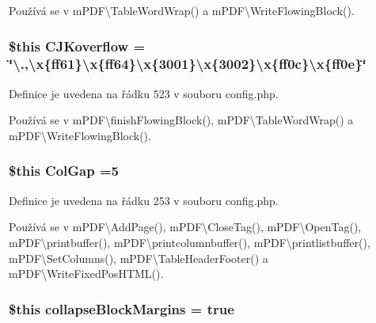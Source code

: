 Používá se v m\-P\-D\-F\textbackslash{}\-Table\-Word\-Wrap() a m\-P\-D\-F\textbackslash{}\-Write\-Flowing\-Block().

\hypertarget{config_8php_af2812cfa35e655533418dd64883a9746}{
\subsubsection[{C\-J\-Koverflow}]{\setlength{\rightskip}{0pt plus 5cm}\$this C\-J\-Koverflow = \char`\"{}\textbackslash{}.,\textbackslash{}x\{ff61\}\textbackslash{}x\{ff64\}\textbackslash{}x\{3001\}\textbackslash{}x\{3002\}\textbackslash{}x\{ff0c\}\textbackslash{}x\{ff0e\}\char`\"{}}}\label{config_8php_af2812cfa35e655533418dd64883a9746}


Definice je uvedena na řádku 523 v souboru config.\-php.



Používá se v m\-P\-D\-F\textbackslash{}finish\-Flowing\-Block(), m\-P\-D\-F\textbackslash{}\-Table\-Word\-Wrap() a m\-P\-D\-F\textbackslash{}\-Write\-Flowing\-Block().

\hypertarget{config_8php_a1884843eec16d69bb53b46c8db0201f5}{
\subsubsection[{Col\-Gap}]{\setlength{\rightskip}{0pt plus 5cm}\$this Col\-Gap =5}}\label{config_8php_a1884843eec16d69bb53b46c8db0201f5}


Definice je uvedena na řádku 253 v souboru config.\-php.



Používá se v m\-P\-D\-F\textbackslash{}\-Add\-Page(), m\-P\-D\-F\textbackslash{}\-Close\-Tag(), m\-P\-D\-F\textbackslash{}\-Open\-Tag(), m\-P\-D\-F\textbackslash{}printbuffer(), m\-P\-D\-F\textbackslash{}printcolumnbuffer(), m\-P\-D\-F\textbackslash{}printlistbuffer(), m\-P\-D\-F\textbackslash{}\-Set\-Columns(), m\-P\-D\-F\textbackslash{}\-Table\-Header\-Footer() a m\-P\-D\-F\textbackslash{}\-Write\-Fixed\-Pos\-H\-T\-M\-L().

\hypertarget{config_8php_a0879eb8787af90206e98406c05413f17}{
\subsubsection[{collapse\-Block\-Margins}]{\setlength{\rightskip}{0pt plus 5cm}\$this collapse\-Block\-Margins = true}}\label{config_8php_a0879eb8787af90206e98406c05413f17}


